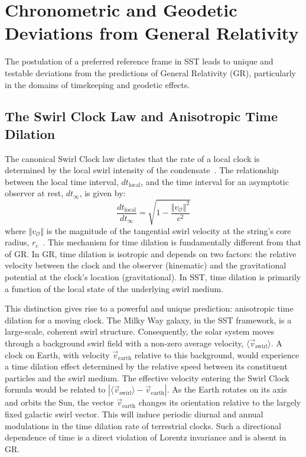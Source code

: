 \documentclass[11pt, a4paper]{article}
\begin{document}
\section{Chronometric and Geodetic Deviations from General Relativity}

    The postulation of a preferred reference frame in SST leads to unique and testable deviations from the predictions of General Relativity (GR), particularly in the domains of timekeeping and geodetic effects.

    \subsection{The Swirl Clock Law and Anisotropic Time Dilation}

        The canonical Swirl Clock law dictates that the rate of a local clock is determined by the local swirl intensity of the condensate~\cite{sst_canon}. The relationship between the local time interval, $dt_{\text{local}}$, and the time interval for an asymptotic observer at rest, $dt_{\infty}$, is given by:
        \begin{equation}
        \frac{dt_{\text{local}}}{dt_{\infty}} = \sqrt{1 - \frac{\Vert v_{\mathcal{O}}\Vert^2}{c^2}}
        \end{equation}
        where $\Vert v_{\mathcal{O}}\Vert$ is the magnitude of the tangential swirl velocity at the string's core radius, $r_c$~\cite{sst_canon}. This mechanism for time dilation is fundamentally different from that of GR. In GR, time dilation is isotropic and depends on two factors: the relative velocity between the clock and the observer (kinematic) and the gravitational potential at the clock's location (gravitational). In SST, time dilation is primarily a function of the local state of the underlying swirl medium.

        This distinction gives rise to a powerful and unique prediction: anisotropic time dilation for a moving clock. The Milky Way galaxy, in the SST framework, is a large-scale, coherent swirl structure. Consequently, the solar system moves through a background swirl field with a non-zero average velocity, $\langle\vec{v}_{\text{swirl}}\rangle$. A clock on Earth, with velocity $\vec{v}_{\text{earth}}$ relative to this background, would experience a time dilation effect determined by the relative speed between its constituent particles and the swirl medium. The effective velocity entering the Swirl Clock formula would be related to $|\langle\vec{v}_{\text{swirl}}\rangle - \vec{v}_{\text{earth}}|$. As the Earth rotates on its axis and orbits the Sun, the vector $\vec{v}_{\text{earth}}$ changes its orientation relative to the largely fixed galactic swirl vector. This will induce periodic diurnal and annual modulations in the time dilation rate of terrestrial clocks. Such a directional dependence of time is a direct violation of Lorentz invariance and is absent in GR.
\end{document}
